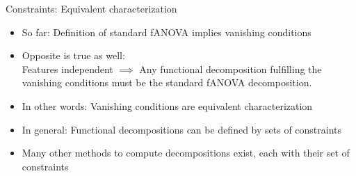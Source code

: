 \documentclass[10pt,compress,t,notes=noshow, xcolor=table]{beamer}
\begin{document}
\begin{frame}{Constraints: Equivalent characterization}

    \begin{itemize}[<+->]
    
        \item So far: Definition of standard fANOVA implies vanishing conditions
        \item Opposite is true as well: \\
        Features independent $\implies$ Any functional decomposition fulfilling the vanishing conditions must be the standard fANOVA decomposition.
        \item In other words: Vanishing conditions are equivalent characterization
        \item In general: Functional decompositions can be defined by sets of constraints \\
        \item Many other methods to compute decompositions exist, each with their set of constraints
    
    \end{itemize}

    
\end{frame}


    
    
    
    
    

     



\endlecture
\end{document}
